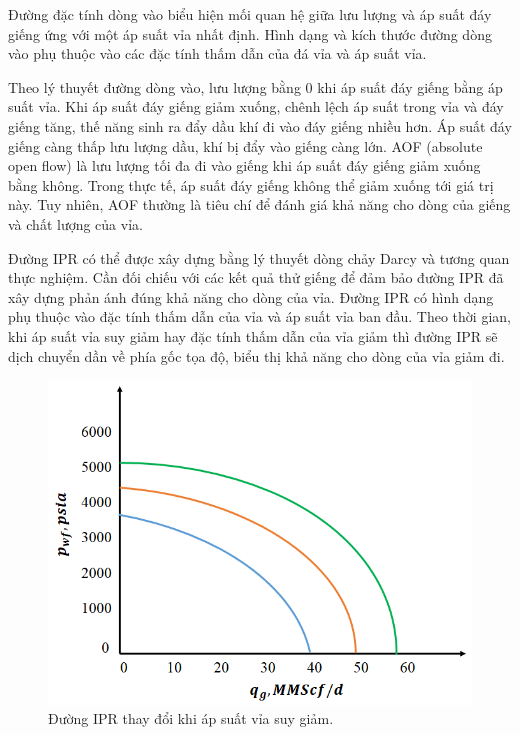 \documentclass[12pt,a4paper]{report}
\begin{document}
Đường đặc tính dòng vào biểu hiện mối quan hệ giữa lưu lượng và áp suất đáy giếng ứng với một áp suất vỉa nhất định. Hình dạng và kích thước đường dòng vào phụ thuộc vào các đặc tính thấm dẫn của đá vỉa và áp suất vỉa.

Theo lý thuyết đường dòng vào, lưu lượng bằng 0 khi áp suất đáy giếng bằng áp suất vỉa. Khi áp suất đáy giếng giảm xuống, chênh lệch áp suất trong vỉa và đáy giếng tăng, thế năng sinh ra đẩy dầu khí đi vào đáy giếng nhiều hơn. Áp suất đáy giếng càng thấp lưu lượng dầu, khí bị đẩy vào giếng càng lớn. AOF (absolute open flow)  là lưu lượng tối đa đi vào giếng khi áp suất đáy giếng giảm xuống bằng không. Trong thực tế, áp suất đáy giếng không thể giảm xuống tới giá trị này. Tuy nhiên, AOF thường là tiêu chí để đánh giá khả năng cho dòng của giếng và chất lượng của vỉa.

Đường IPR có thể được xây dựng bằng lý thuyết dòng chảy Darcy và tương quan thực nghiệm. Cần đối chiếu với các kết quả thử giếng để đảm bảo đường IPR đã xây dựng phản ánh đúng khả năng cho dòng của vỉa. Đường IPR có hình dạng phụ thuộc vào đặc tính thấm dẫn của vỉa và áp suất vỉa ban đầu. Theo thời gian, khi áp suất vỉa suy giảm hay đặc tính thấm dẫn của vỉa giảm thì đường IPR sẽ dịch chuyển dần về phía gốc tọa độ, biểu thị khả năng cho dòng của vỉa giảm đi.

	\begin{figure}[h]
		\centering
		\includegraphics[scale=0.75]{fig/ipr_change_with_pressure.png}
		\caption{Đường IPR thay đổi khi áp suất vỉa suy giảm.}
		\label{fig:ipr_change_with_pressure}
	\end{figure}
\end{document}
